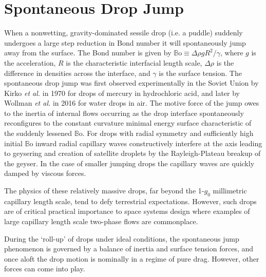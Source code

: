 \documentclass[aip,reprint, floatfix]{revtex4-1}
\begin{document}
\pacs{}%

\maketitle %

\section{Spontaneous Drop Jump}
When a nonwetting, gravity-dominated sessile drop (i.e. a puddle) suddenly undergoes a large step reduction in Bond number it will spontaneously jump away from the surface. The Bond number is given by $\mathbb{B}\mbox{o} \equiv \Delta \rho g R^2 / \gamma$, where $g$ is the acceleration, $R$ is the characteristic interfacial length scale, $\Delta \rho$ is the difference in densities across the interface, and $\gamma$ is the surface tension. The spontaneous drop jump was first observed experimentally in the Soviet Union by Kirko \emph{et al.} \cite{kirko_phenomenon_1970} in 1970 for drops of mercury in hydrochloric acid, and later by Wollman \emph{et al.} \cite{wollman_more_2016} in 2016 for water drops in air. The motive force of the jump owes to the inertia of internal flows occurring as the drop interface spontaneously reconfigures to the constant curvature minimal energy surface characteristic of the suddenly lessened $\mathbb{B}\mbox{o}$. For drops with radial symmetry and sufficiently high initial $\mathbb{B}\mbox{o}$ inward radial capillary waves constructively interfere at the axis leading to geysering and creation of satellite droplets by the Rayleigh-Plateau breakup of the geyser. In the case of smaller jumping drops the capillary waves are quickly damped by viscous forces.

The physics of these relatively massive drops, far beyond the 1-$g_0$ millimetric capillary length scale, tend to defy terrestrial expectations. However, such drops are of critical practical importance to space systems design where examples of large capillary length scale two-phase flows are commonplace.

During the `roll-up' of drops under ideal conditions, the spontaneous jump phenomenon is governed by a balance of inertia and surface tension forces, and once aloft the drop motion is nominally in a regime of pure drag. However, other forces can come into play. 
\end{document}
